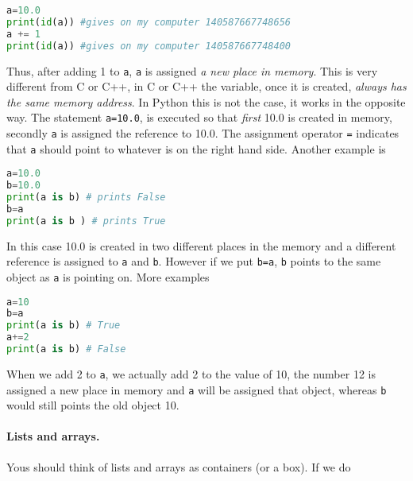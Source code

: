 \documentclass[graybox,sectrefs,envcountresetchap,open=right,final]{svmonodo}
\begin{document}
\begin{lstlisting}[language=python,style=blue1bar]
a=10.0
print(id(a)) #gives on my computer 140587667748656
a += 1
print(id(a)) #gives on my computer 140587667748400

\end{lstlisting}

Thus, after adding 1 to \texttt{a}, \texttt{a} is assigned \emph{a new place in memory}. This is very different from C or C++, in C or C++ the variable, once it is created, \emph{always has the same memory address}. In Python this is not the case, it works in the opposite way. The statement \texttt{a=10.0}, is executed so that \emph{first} 10.0 is created in memory, secondly \texttt{a} is assigned the reference to 10.0. The assignment operator \texttt{=} indicates that \texttt{a} should point to whatever is on the right hand side. Another example is     






\begin{lstlisting}[language=python,style=blue1bar]
a=10.0
b=10.0
print(a is b) # prints False
b=a
print(a is b ) # prints True

\end{lstlisting}

In this case 10.0 is created in two different places in the memory and a different reference is assigned to \texttt{a} and \texttt{b}. However if we put \texttt{b=a}, \texttt{b} points to the same object as \texttt{a} is pointing on. More examples






\begin{lstlisting}[language=python,style=blue1bar]
a=10
b=a
print(a is b) # True
a+=2
print(a is b) # False

\end{lstlisting}

When we add 2 to \texttt{a}, we actually add 2 to the value of 10, the number 12 is assigned a new place in memory and \texttt{a} will be assigned that object, whereas \texttt{b} would still points the old object 10.

\paragraph{Lists and arrays.}
Yous should think of lists and arrays as containers (or a box). If we do
\end{document}
